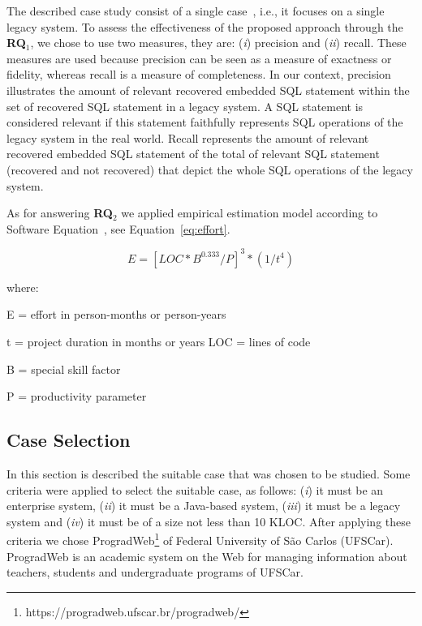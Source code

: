 \documentclass[a4paper,twoside]{article}
\begin{document}
The described case study consist of a single case~\cite{citeulike:598898}, i.e., it focuses on a single legacy system. To assess the effectiveness of the proposed approach through the \textbf{RQ$_1$}, we chose to use two measures, they are: (\textit{i}) precision and (\textit{ii}) recall. These measures are used because precision can be seen as a measure of exactness or fidelity, whereas recall is a measure of completeness. In our context, precision illustrates the amount of relevant recovered embedded SQL statement within the set of recovered SQL statement in a legacy system. A SQL statement is considered relevant if this statement faithfully represents SQL operations of the legacy system in the real world. Recall represents the amount of relevant recovered embedded SQL statement of the total of relevant SQL statement (recovered and not recovered) that depict the whole SQL operations of the legacy system.

As for answering \textbf{RQ$_2$} we applied empirical estimation model according to Software Equation~\cite{Putnam:1991:MER:574087}, see Equation~\ref{eq:effort}. 

\begin{equation}
  E = [LOC * B^{0.333}/P]^3 * (1/t^4)
  \label{eq:effort}
\end{equation}

where:

E = effort in person-months or person-years 

t = project duration in months or years LOC = lines of code

B = special skill factor

P = productivity parameter


\subsection{Case Selection} %
\label{sub:case_selection}

In this section is described the suitable case that was chosen to be studied. Some criteria were applied to select the suitable case, as follows: (\textit{i}) it must be an enterprise system, (\textit{ii}) it must be a Java-based system, (\textit{iii}) it must be a legacy system and (\textit{iv}) it must be of a size not less than 10 KLOC. After applying these criteria we chose ProgradWeb\footnote{https://progradweb.ufscar.br/progradweb/} of Federal University of S\~ao Carlos (UFSCar). ProgradWeb is an academic system on the Web for managing information about teachers, students and undergraduate programs of UFSCar. 
\end{document}

